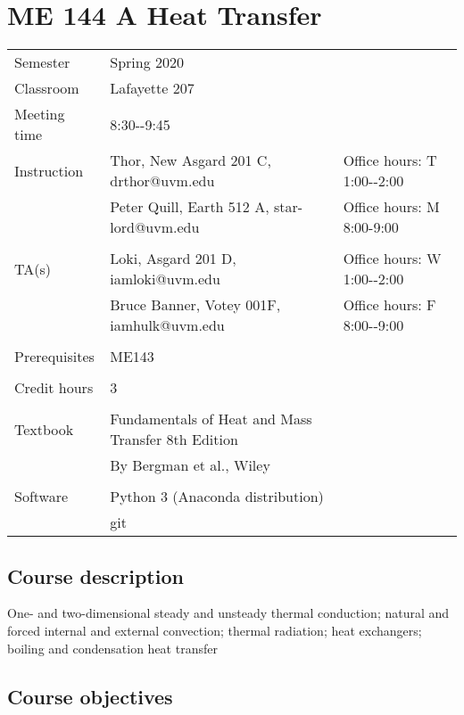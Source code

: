 \documentclass{article}%
\begin{document}
%
\normalsize%
\section*{ME 144 A Heat Transfer}%
\label{sec:ME 144 A Heat Transfer}%
\begin{tabular}{lll}%
Semester&Spring 2020&\\%
Classroom&Lafayette 207&\\%
Meeting time&8:30{-}{-}9:45&\\%
Instruction&Thor, New Asgard 201 C, drthor@uvm.edu&Office hours: T 1:00{-}{-}2:00\\%
&Peter Quill, Earth 512 A, star{-}lord@uvm.edu&Office hours: M 8:00{-}9:00\\%
&&\\%
TA(s)&Loki, Asgard 201 D, iamloki@uvm.edu&Office hours: W 1:00{-}{-}2:00\\%
&Bruce Banner, Votey 001F, iamhulk@uvm.edu&Office hours: F 8:00{-}{-}9:00\\%
&&\\%
Prerequisites&ME143&\\%
&&\\%
Credit hours&3&\\%
&&\\%
Textbook&Fundamentals of Heat and Mass Transfer 8th Edition&\\%
&By Bergman et al., Wiley&\\%
&&\\%
Software&Python 3 (Anaconda distribution)&\\%
&git&\\%
\end{tabular}%
\subsection*{Course description}%
\label{subsec:Course description}%

%
One{-} and two{-}dimensional steady and unsteady thermal conduction;                     natural and forced internal and external convection;                     thermal radiation; heat exchangers;                     boiling and condensation heat transfer%
\subsection*{Course objectives}%
\label{subsec:Course objectives}%
\end{document}
